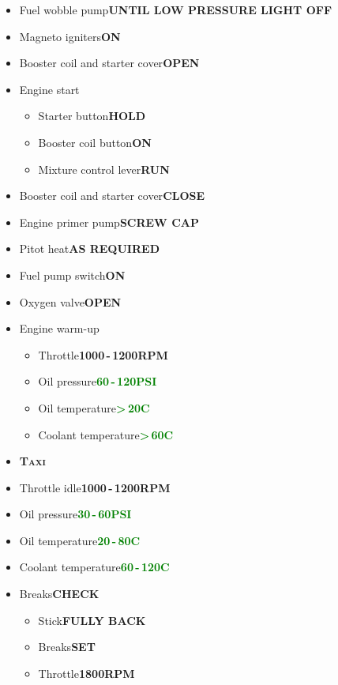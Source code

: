 \documentclass[a4paper,12pt,dvipsnames]{letter}
\newcommand{\button}[1]{\textbf{#1}}
\newcommand{\degC}{\textdegree{}C}
\newcommand{\ok}[1]{\textcolor{Green}{\textbf{#1}}}
\newcommand{\myHead}[1]{{\LARGE\textsc{\textbf{#1}}}}
\begin{document}
{\begin{itemize}
 \item Fuel wobble pump\dotfill\button{UNTIL LOW PRESSURE LIGHT OFF}
 \item Magneto igniters\dotfill\button{ON}
 \item Booster coil and starter cover\dotfill\button{OPEN}
 \item Engine start
 \begin{itemize}
  \item Starter button\dotfill\button{HOLD}
  \item Booster coil button\dotfill\button{ON}
  \item Mixture control lever\dotfill\button{RUN}
 \end{itemize}
 \item Booster coil and starter cover\dotfill\button{CLOSE}
 \item Engine primer pump\dotfill\button{SCREW CAP}
 \item Pitot heat\dotfill\button{AS REQUIRED}
 \item Fuel pump switch\dotfill\button{ON}
 \item Oxygen valve\dotfill\button{OPEN}
 \item Engine warm-up
 \begin{itemize}
  \item Throttle\dotfill\button{1000\,-\,1200\;RPM}
  \item Oil pressure\dotfill\ok{60\,-\,120\;PSI}
  \item Oil temperature\dotfill\ok{>\,20\degC}
  \item Coolant temperature\dotfill\ok{>\,60\degC}
 \end{itemize}
\end{itemize}
\newpage
\begin{itemize}
 \item[] \myHead{Taxi}
 \item Throttle idle\dotfill\button{1000\,-\,1200\;RPM}
 \item Oil pressure\dotfill\ok{30\,-\,60\;PSI}
 \item Oil temperature\dotfill\ok{20\,-\,80\degC}
 \item Coolant temperature\dotfill\ok{60\,-\,120\degC}
 \item Breaks\dotfill\button{CHECK}
 \begin{itemize}
  \item Stick\dotfill\button{FULLY BACK}
  \item Breaks\dotfill\button{SET}
  \item Throttle\dotfill\button{1800\;RPM}

\end{itemize}
\end{itemize}}
\end{document}
